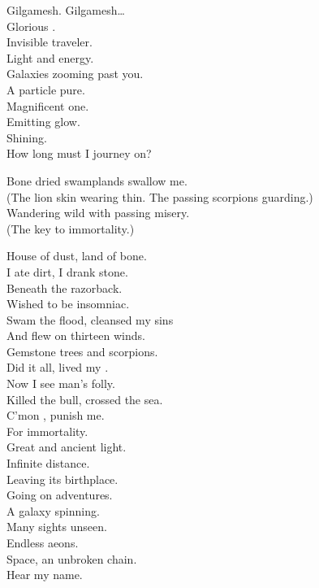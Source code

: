 Gilgamesh. Gilgamesh… \\

Glorious . \\
Invisible traveler. \\
Light and energy. \\
Galaxies zooming past you. \\
A particle pure. \\
Magnificent one. \\
Emitting glow. \\
Shining. \\
How long must I journey on? \\


Bone dried swamplands swallow me. \\
(The lion skin wearing thin. The passing scorpions guarding.) \\
Wandering wild with passing misery. \\
(The key to immortality.) \\


House of dust, land of bone. \\
I ate dirt, I drank stone. \\
Beneath the razorback. \\
Wished to be insomniac. \\
Swam the flood, cleansed my sins \\
And flew on thirteen winds. \\
Gemstone trees and scorpions. \\
Did it all, lived my . \\
Now I see man's folly. \\
Killed the bull, crossed the sea. \\
C'mon , punish me. \\
For immortality. \\

Great and ancient light. \\
Infinite distance. \\
Leaving its birthplace. \\
Going on adventures. \\
A galaxy spinning. \\
Many sights unseen. \\
Endless aeons. \\
Space, an unbroken chain. \\
Hear my name. \\

